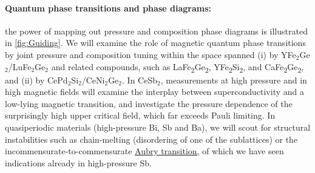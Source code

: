 \paragraph{Quantum phase transitions and phase diagrams:} 
the power of mapping out pressure and composition phase diagrams is illustrated in \autoref{fig:Guiding}. We will examine the role of magnetic quantum phase transitions by joint pressure and composition tuning within the space spanned (i) by YFe$_2$Ge$_2$/LuFe$_2$Ge$_2$ and related compounds, such as
LaFe\textsubscript{2}Ge\textsubscript{2}, YFe\textsubscript{2}Si\textsubscript{2}, and CaFe\textsubscript{2}Ge\textsubscript{2}, and (ii) by CePd$_2$Si$_2$/CeNi$_2$Ge$_2$. In CeSb$_2$, measurements at high pressure and in high magnetic fields will examine the interplay between superconductivity and a low-lying magnetic transition, and investigate the pressure dependence of the surprisingly high upper critical field, which far exceeds Pauli limiting. In quasiperiodic materials (high-pressure Bi, Sb and Ba), we will scout for structural instabilities such as chain-melting (disordering of one of the sublattices) or the incommensurate-to-commensurate \ul{Aubry transition,} of which we have seen indications already in high-pressure Sb. 


